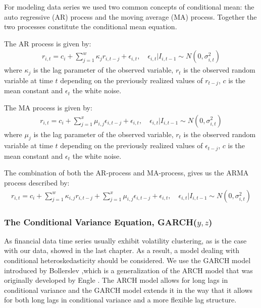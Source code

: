 For modeling data series we used two common concepts of conditional mean: the auto regressive (AR) process and the moving average (MA) process. Together the two processes constitute the conditional mean equation. 

The AR process is given by:
\begin{align}
    r_{i,t}=c_i + \sum_{j=1}^w\kappa_j r_{i,t-j} + \epsilon_{i,t},\quad \epsilon_{i,t} | I_{i,t-1} \sim N(0,{\sigma_{i,t}^2}) \label{ConditionalMeanEquation}
\end{align}
where $\kappa_j$ is the lag parameter of the observed variable, $r_t$ is the observed random variable at time $t$ depending on the previously realized values of $r_{t-j}$, $c$ is the mean constant and $\epsilon_t$ the white noise.

The MA process is given by:
\begin{align}
    r_{i,t}=c_i + \sum_{j=1}^x\mu_{i,j} \epsilon_{i,t-j} + \epsilon_{i,t},\quad \epsilon_{i,t} | I_{i,t-1} \sim N(0,{\sigma_{i,t}^2}) \label{ConditionalMeanEquation}
\end{align}
where $\mu_j$ is the lag parameter of the observed variable, $r_t$ is the observed random variable at time $t$ depending on the previously realized values of $\epsilon_{t-j}$, $c$ is the mean constant and $\epsilon_t$ the white noise.

The combination of both the AR-process and MA-process, gives us the ARMA process described by:
\begin{align}
    r_{i,t}=c_i+\sum_{j=1}^w\kappa_{i,j} r_{i,t-j}+\sum_{j=1}^x\mu_{i,j} \epsilon_{i,t-j}+\epsilon_{i,t},\quad \epsilon_{i,t} | I_{i,t-1} \sim N(0,{\sigma_{i,t}^2}) \label{ConditionalMeanEquation}
\end{align}

\subsubsection{The Conditional Variance Equation, GARCH($y,z$)}
As financial data time series usually exhibit volatility clustering, as is the case with our data, showed in the last chapter. As a result, a model dealing with conditional heteroskedasticity should be considered. We use the GARCH model introduced by Bollerslev \cite{Bollerslev},which is a generalization of the ARCH model that was originally developed by Engle \cite{Engel}. The ARCH model allows for long lags in conditional variance and the GARCH model extends it in the way that it allows for both long lags in conditional variance and a more flexible lag structure.

